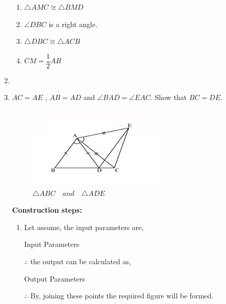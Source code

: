 \begin{enumerate}[label=\thesection.\arabic*,ref=\thesection.\theenumi]
\begin{enumerate}
\item $\triangle AMC \cong \triangle BMD$
\item $\angle DBC$ is a right angle.
\item $\triangle DBC \cong \triangle ACB$
\item $CM = \dfrac{1}{2}AB$
\end{enumerate}
\label{chapters/9/7/1/8}

\item
%
\item $AC = AE$ , $AB = AD$ and $\angle BAD = \angle EAC$. Show that $BC = DE$.
\begin{figure}[H]
    \includegraphics[width=\columnwidth]{figs/ABCDE.png}
	\caption{$\triangle ABC \hspace{12pt} and \hspace{12pt} \triangle ADE $}
 \label{fig:fig1}
\end{figure}
\textbf{Construction steps:}
		\begin{enumerate}[label=(\roman*)]
\item Let assume, the input parameters are, 
\begin{table}[H]
\centering
	
	  \caption{Input Parameters}
	  \label{Table-1: }
\end{table}
$\therefore$ the output can be calculated as,
\begin{table}[H]
\centering
	
	  \caption{Output Parameters}
	  \label{Table-2: }
\end{table}
$\therefore$ By, joining these points the required figure will be formed.
\begin{figure}[H]

\end{figure}
\end{enumerate}
\end{enumerate}
